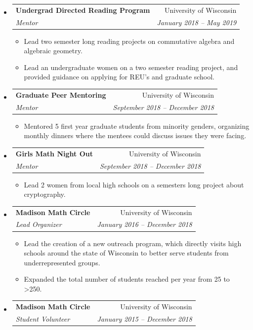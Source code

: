 \documentclass[letterpaper,11pt]{article}
\makeatletter
\newcommand{\resitem}[1]{\item #1 \vspace{-2pt}}
\newcommand{\ressubheading}[4]{
\begin{tabular*}{6.5in}[t]{l@{\cftdotfill{\cftsecdotsep}\extracolsep{\fill}}r}
		\textbf{#1} & #2 \\
		\textit{#3} & \textit{#4} \\
\end{tabular*}\vspace{-6pt}}
\makeatother
\begin{document}
\begin{itemize}
%
%
%	
\item 
	\ressubheading{Undergrad Directed Reading Program}{University of Wisconsin}{Mentor}{January 2018 -- May 2019}
	\begin{itemize}
		\resitem{Lead two semester long reading projects on commutative algebra and algebraic geometry.}
		\resitem{Lead an undergraduate women on a two semester reading project, and provided guidance on applying for REU's and graduate school.}
	\end{itemize}
	
\item 
	\ressubheading{Graduate Peer Mentoring}{University of Wisconsin}{Mentor}{September 2018 -- December 2018}
	\begin{itemize}
		\resitem{Mentored 5 first year graduate students from minority genders, organizing monthly dinners where the mentees could discuss issues they were facing.}
	\end{itemize}
		
\item 
	\ressubheading{Girls Math Night Out}{University of Wisconsin}{Mentor}{September 2018 -- December 2018}
	\begin{itemize}
		\resitem{Lead 2 women from local high schools on a semesters long project about cryptography.}
	\end{itemize}

\item 
	\ressubheading{Madison Math Circle}{University of Wisconsin}{Lead Organizer}{January 2016 -- December 2018}
	\begin{itemize}
		\resitem{Lead the creation of a new outreach program, which directly visits high schools around the state of Wisconsin to better serve students from underrepresented groups.}
		\resitem{Expanded the total number of students reached per year from 25 to >250.}
	\end{itemize}

\item 
	\ressubheading{Madison Math Circle}{University of Wisconsin}{Student Volunteer}{January 2015 -- December 2018}
	

\end{itemize}
\end{document}

